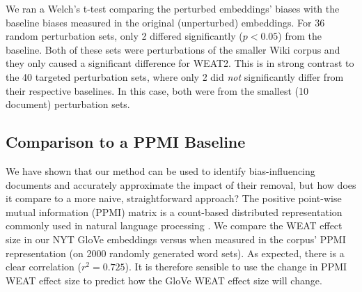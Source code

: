\documentclass{article}
\begin{document}
We ran a Welch's t-test comparing the perturbed embeddings' biases with the baseline biases measured in the original (unperturbed) embeddings.
For 36 random perturbation sets, only 2 differed significantly ($p < 0.05$) from the baseline.
Both of these sets were perturbations of the smaller Wiki corpus and they only caused a significant difference for WEAT2.
This is in strong contrast to the 40 targeted perturbation sets, where only 2 did \emph{not} significantly differ from their respective baselines.
In this case, both were from the smallest (10 document) perturbation sets.





\subsection{Comparison to a PPMI Baseline}
We have shown that our method can be used to identify bias-influencing documents and accurately approximate the impact of their removal, but how does it compare to a more naive, straightforward approach? 
The positive point-wise mutual information (PPMI) matrix is a count-based distributed representation commonly used in natural language processing \cite{PPMI}. 
We compare the WEAT effect size in our NYT GloVe embeddings versus when measured in the corpus' PPMI representation (on 2000 randomly generated word sets).
As expected, there is a clear correlation ($r^2=0.725$). 
It is therefore sensible to use the change in PPMI WEAT effect size to predict how the GloVe WEAT effect size will change.
\end{document}
